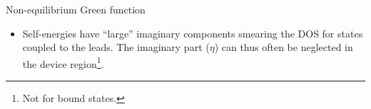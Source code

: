 \begin{frame}
\begin{block}{Non-equilibrium Green function}
\begin{itemize}
\begin{center}
\begin{columns}
{\begin{tikzpicture}[z=.5cm,>=latex,scale=.75,font=\scriptsize]
    \end{tikzpicture}

}
      \end{columns}

    \end{center}

    \item<4-> Self-energies have ``large'' imaginary components smearing the DOS for states
    coupled to the leads. The imaginary part ($\eta$) can thus often be neglected in the
    device region\footnote<4->{Not for bound states.}.

    \end{itemize}

  \end{block}


\end{frame}


